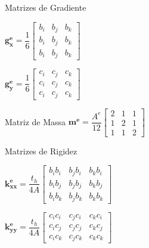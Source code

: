 \documentclass{beamer}
\begin{document}
\begin{frame}
\begin{minipage}{.56\textwidth}
    \begin{block}{Matrizes de Gradiente}
      \begin{minipage}{.48\textwidth}
	$\mathbf{g_x^e} =
	\dfrac{1}{6}
	\begin{bmatrix} 
	  b_i & b_j & b_k \\
	  b_i & b_j & b_k \\
	  b_i & b_j & b_k
	\end{bmatrix}$
      \end{minipage}
      \hfill
      \begin{minipage}{.48\textwidth}
	$\mathbf{g_y^e} =
	\dfrac{1}{6}
	\begin{bmatrix} 
	  c_i & c_j & c_k \\
	  c_i & c_j & c_k \\
	  c_i & c_j & c_k
	\end{bmatrix} $
      \end{minipage}
    \end{block}
  \end{minipage}
  
  \begin{minipage}{.24\textwidth}
    \begin{block}{Matriz de Massa}
      $\mathbf{m^e} =
      \dfrac{A^e}{12}
      \begin{bmatrix} 
	  2 & 1 & 1 \\
	  1 & 2 & 1 \\
	  1 & 1 & 2
      \end{bmatrix}$
    \end{block}
  \end{minipage}
  \hfill
  \begin{minipage}{.72\textwidth}
    \begin{block}{Matrizes de Rigidez}
      \begin{minipage}{.48\textwidth}
	$\mathbf{k_{xx}^e} =
	\dfrac{t_h}{4A}
	\begin{bmatrix} 
	    b_i b_i & b_j b_i & b_k b_i \\
	    b_i b_j & b_j b_j & b_k b_j \\
	    b_i b_k & b_j b_k & b_k b_k
	\end{bmatrix} $
      \end{minipage}
      \hfill
      \begin{minipage}{.48\textwidth}
	$\mathbf{k_{yy}^e} =
	\dfrac{t_h}{4A}
	\begin{bmatrix} 
	    c_i c_i & c_j c_i & c_k c_i \\
	    c_i c_j & c_j c_j & c_k c_j \\
	    c_i c_k & c_j c_k & c_k c_k
	\end{bmatrix}$
      \end{minipage}
    \end{block}
  \end{minipage}
\end{frame}
\end{document}
